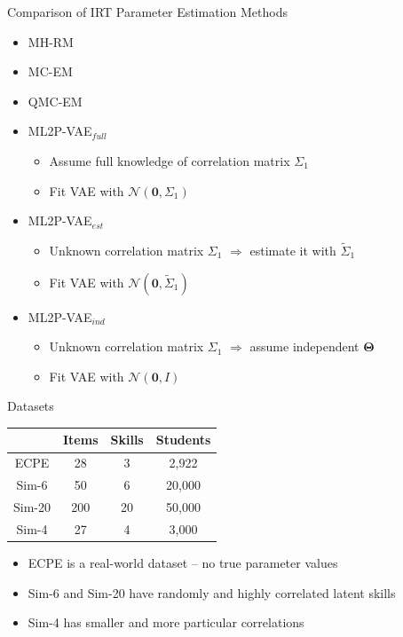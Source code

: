\documentclass{beamer}
\newcommand{\vect}[1]{\boldsymbol{#1}}
\theoremstyle{definition}
\begin{document}
\begin{frame}{Comparison of IRT Parameter Estimation Methods}
  \begin{itemize}
    \item MH-RM 
    \item MC-EM 
    \item QMC-EM
    \item<2-> ML2P-VAE$_{full}$ 
      \begin{itemize}
        \item Assume full knowledge of correlation matrix $\Sigma_1$
        \item Fit VAE with $\mathcal{N}(\vect 0, \Sigma_1)$
      \end{itemize}
    \item<3-> ML2P-VAE$_{est}$ 
      \begin{itemize}
        \item Unknown correlation matrix $\Sigma_1$ $\Rightarrow$ estimate it with $\tilde \Sigma_1$
        \item Fit VAE with $\mathcal{N}(\vect 0, \tilde \Sigma_1)$
      \end{itemize}
    \item<4-> ML2P-VAE$_{ind}$ 
      \begin{itemize}
        \item Unknown correlation matrix $\Sigma_1$ $\Rightarrow$ assume independent $\vect \Theta$
        \item Fit VAE with $\mathcal{N}(\vect 0, I)$
      \end{itemize}
  \end{itemize}
\end{frame}

\begin{frame}{Datasets}
  \begin{table}
    \centering
    \begin{tabular}{c|ccc}
      & Items & Skills & Students \\
      \hline
      ECPE & 28 & 3 & 2,922 \\ 
      Sim-6 & 50 & 6 & 20,000 \\
      Sim-20 & 200 & 20 & 50,000 \\
      Sim-4 & 27 & 4 & 3,000  
    \end{tabular}
  \end{table}
  \begin{itemize}
    \item ECPE is a real-world dataset -- no true parameter values
    \item Sim-6 and Sim-20 have randomly and highly correlated latent skills
    \item Sim-4 has smaller and more particular correlations
  \end{itemize}
\end{frame}
\end{document}

